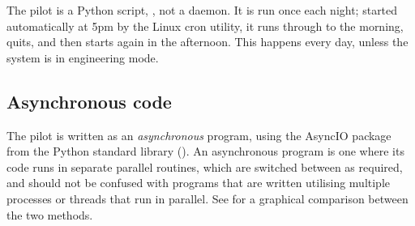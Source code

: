 \begin{colsection}

The pilot is a Python script, , not a daemon. It is run once each night; started automatically at 5pm by the Linux cron utility, it runs through to the morning, quits, and then starts again in the afternoon. This happens every day, unless the system is in engineering mode.

\end{colsection}


\subsection{Asynchronous code}
\label{sec:async}
\begin{colsection}

The pilot is written as an \textit{asynchronous} program, using the AsyncIO package from the Python standard library (). An asynchronous program is one where its code runs in separate parallel routines, which are switched between as required, and should not be confused with programs that are written utilising multiple processes or threads that run in parallel. See  for a graphical comparison between the two methods.


\end{colsection}
